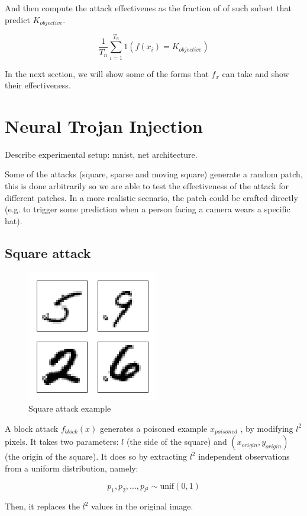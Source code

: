 \documentclass[letterpaper, 10 pt, conference]{ieeeconf}  %
\begin{document}
And then compute the attack effectivenes as the fraction of of such subset that predict $K_{objective}$.

$$\frac{1}{T_n} \sum_{i=1}^{T_n} 1(f(x_i) = K_{objective})$$

In the next section, we will show some of the forms that $f_x$ can take and show their effectiveness.


\section{Neural Trojan Injection}

Describe experimental setup: mnist, net architecture.

Some of the attacks (square, sparse and moving square) generate a random patch,
this is done arbitrarily so we are able to test the effectiveness of the attack
for different patches. In a more realistic scenario, the patch could be
crafted directly (e.g. to trigger some prediction when a person facing a camera
wears a specific hat).

\subsection{Square attack}

\begin{figure}[h]
\caption{Square attack example}
\centering
\includegraphics{square.png}
\end{figure}


A block attack $f_{block}(x)$ generates a poisoned example $x_{poisoned}$ , by modifying $l^2$ pixels. It takes two parameters: $l$ (the side of the square) and $(x_{origin}, y_{origin})$ (the origin of the square). It does so by extracting $l^2$ independent observations from a uniform distribution, namely:

$$p_1, p_2,...,p_{l^2}\sim \text{unif}(0, 1)$$

Then, it replaces the $l^2$ values in the original image.
\end{document}
